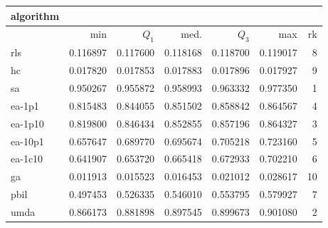 \begin{tabular}{@{}l*{5}{>{{}}N{1}{3}}>{{}}N{2}{0}@{}}
\toprule
{algorithm} &  \\
\midrule
& {min} & {$Q_1$} & {med.} & {$Q_3$} & {max} & {rk}\\
\midrule
rls & 0.116897 & 0.117600 & 0.118168 & 0.118700 & 0.119017 & 8\\
hc & 0.017820 & 0.017853 & 0.017883 & 0.017896 & 0.017927 & 9\\
sa & {\color{blue}} 0.950267 & {\color{blue}} 0.955872 & {\color{blue}} 0.958993 & {\color{blue}} 0.963332 & {\color{blue}} 0.977350 & 1\\
ea-1p1 & 0.815483 & 0.844055 & 0.851502 & 0.858842 & 0.864567 & 4\\
ea-1p10 & 0.819800 & 0.846434 & 0.852855 & 0.857196 & 0.864327 & 3\\
ea-10p1 & 0.657647 & 0.689770 & 0.695674 & 0.705218 & 0.723160 & 5\\
ea-1c10 & 0.641907 & 0.653720 & 0.665418 & 0.672933 & 0.702210 & 6\\
ga & 0.011913 & 0.015523 & 0.016453 & 0.021012 & 0.028617 & 10\\
pbil & 0.497453 & 0.526335 & 0.546010 & 0.553795 & 0.579927 & 7\\
umda & 0.866173 & 0.881898 & 0.897545 & 0.899673 & 0.901080 & 2\\
\bottomrule
\end{tabular}
